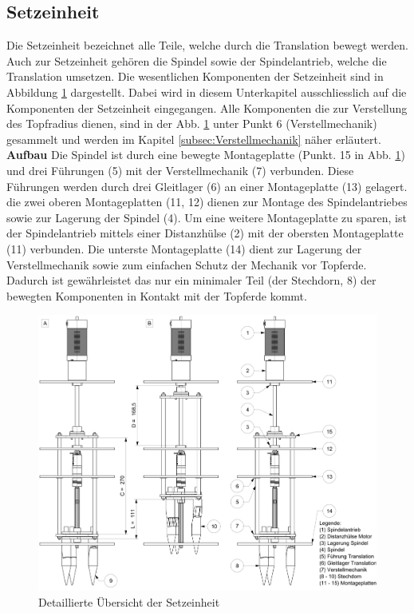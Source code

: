\subsection{Setzeinheit}
Die Setzeinheit bezeichnet alle Teile, welche durch die Translation bewegt werden. Auch zur Setzeinheit gehören die Spindel sowie der Spindelantrieb, welche die Translation umsetzen.
\newline
Die wesentlichen Komponenten der Setzeinheit sind in Abbildung \ref{fig:setzeinheit} dargestellt. Dabei wird in diesem Unterkapitel ausschliesslich auf die Komponenten der Setzeinheit eingegangen. Alle Komponenten die zur Verstellung des Topfradius dienen, sind in der Abb.  \ref{fig:setzeinheit} unter Punkt 6 (Verstellmechanik) gesammelt und werden im Kapitel \ref{subsec:Verstellmechanik} näher erläutert.
\newline
\newline
\textbf{Aufbau}
\newline
Die Spindel ist durch eine bewegte Montageplatte (Punkt. 15 in Abb. \ref{fig:setzeinheit}) und drei Führungen (5) mit der Verstellmechanik (7) verbunden. Diese Führungen werden durch drei Gleitlager (6)  an einer Montageplatte (13) gelagert. die zwei oberen Montageplatten (11, 12) dienen zur Montage des Spindelantriebes sowie zur Lagerung der Spindel (4). Um eine weitere Montageplatte zu sparen, ist der Spindelantrieb mittels einer Distanzhülse (2) mit der obersten Montageplatte (11) verbunden. Die unterste Montageplatte (14) dient zur Lagerung der Verstellmechanik sowie zum einfachen Schutz der Mechanik vor Topferde. Dadurch ist gewährleistet das nur ein minimaler Teil (der Stechdorn, 8) der bewegten Komponenten in Kontakt mit der Topferde kommt.
	\begin{figure}[H]
	\includegraphics[scale=0.53]{Illustrationen/6-Umsetzung/setzeinheit_aio.jpg}
	\caption{Detaillierte Übersicht der Setzeinheit}
	\label{fig:setzeinheit}
\end{figure}

